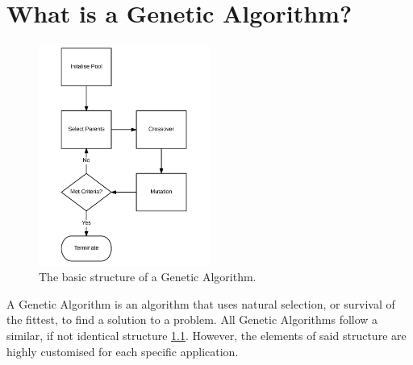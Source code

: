 \chapter{What is a Genetic Algorithm?}

\begin{figure}
	\centering
		\includegraphics[width=0.5\textwidth]{GA_Structure}
	\caption{The basic structure of a Genetic Algorithm. \label{fig:struct}}

\end{figure}

\par
A Genetic Algorithm is an algorithm that uses natural selection, or survival of the fittest, to find a solution to a problem. All Genetic Algorithms follow a similar, if not identical structure \ref{fig:struct}. However, the elements of said structure are highly customised for each specific application.

\begin{lstlisting}

\end{lstlisting}